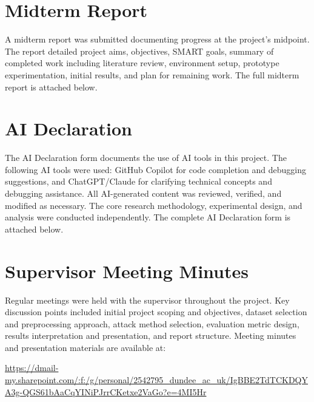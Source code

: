 \documentclass[12pt,a4paper]{article}
\begin{document}
\begin{appendices}
    
    
    \section{Midterm Report}
    \label{app:midterm}
    
    A midterm report was submitted documenting progress at the project's midpoint. The report detailed project aims, objectives, SMART goals, summary of completed work including literature review, environment setup, prototype experimentation, initial results, and plan for remaining work. The full midterm report is attached below.
    
    
    
    \section{AI Declaration}
    \label{app:ai}
    
    The AI Declaration form documents the use of AI tools in this project. The following AI tools were used: GitHub Copilot for code completion and debugging suggestions, and ChatGPT/Claude for clarifying technical concepts and debugging assistance. All AI-generated content was reviewed, verified, and modified as necessary. The core research methodology, experimental design, and analysis were conducted independently. The complete AI Declaration form is attached below.
    
    
    
    \section{Supervisor Meeting Minutes}
    \label{app:meetings}
    
    Regular meetings were held with the supervisor throughout the project. Key discussion points included initial project scoping and objectives, dataset selection and preprocessing approach, attack method selection, evaluation metric design, results interpretation and presentation, and report structure. Meeting minutes and presentation materials are available at:
    
    \url{https://dmail-my.sharepoint.com/:f:/g/personal/2542795_dundee_ac_uk/IgBBE2TdTCKDQYA3g-QGS61bAaCqYINiPJrrCKetxe2VaGo?e=4MI5Hr}
    

\end{appendices}
\end{document}
